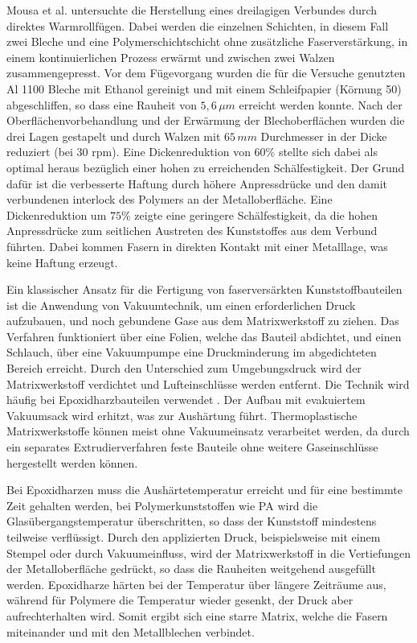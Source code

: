 Mousa et al. \cite{Mousa.2017} untersuchte die Herstellung eines dreilagigen Verbundes durch direktes Warmrollfügen. Dabei werden die einzelnen Schichten, in diesem Fall zwei Bleche und eine Polymerschichtschicht ohne zusätzliche Faserverstärkung, in einem kontinuierlichen Prozess erwärmt und zwischen zwei Walzen zusammengepresst. 
Vor dem Fügevorgang wurden die für die Versuche genutzten Al 1100 Bleche mit Ethanol gereinigt und mit einem Schleifpapier (Körnung 50) abgeschliffen, so dass eine Rauheit von $5,6\, \mu m$ erreicht werden konnte. Nach der Oberflächenvorbehandlung und der Erwärmung der Blechoberflächen wurden die drei Lagen gestapelt und durch Walzen mit $65\, mm$ Durchmesser in der Dicke reduziert (bei 30 rpm). Eine  Dickenreduktion von $60 \%$ stellte sich dabei als optimal heraus bezüglich einer hohen zu erreichenden Schälfestigkeit.
Der Grund dafür ist die verbesserte Haftung durch höhere Anpressdrücke und den damit verbundenen interlock des Polymers an der Metalloberfläche. Eine Dickenreduktion um $75\%$ zeigte eine geringere Schälfestigkeit, da die hohen Anpressdrücke zum seitlichen Austreten des Kunststoffes aus dem Verbund führten. Dabei kommen Fasern in direkten Kontakt mit einer Metalllage, was keine Haftung erzeugt. 

Ein klassischer Ansatz für die Fertigung von faserversärkten Kunststoffbauteilen ist die Anwendung von Vakuumtechnik, um einen erforderlichen Druck aufzubauen, und noch gebundene Gase aus dem Matrixwerkstoff zu ziehen. Das Verfahren funktioniert über eine Folien, welche das Bauteil abdichtet, und einen Schlauch, über eine Vakuumpumpe eine Druckminderung im abgedichteten Bereich erreicht. Durch den Unterschied zum Umgebungsdruck wird der Matrixwerkstoff verdichtet und Lufteinschlüsse werden entfernt. Die Technik wird häufig bei Epoxidharzbauteilen verwendet \cite{Bellini.2020}. Der Aufbau mit evakuiertem Vakuumsack wird erhitzt, was zur Aushärtung führt. Thermoplastische Matrixwerkstoffe können meist ohne Vakuumeinsatz verarbeitet werden, da durch ein separates Extrudierverfahren feste Bauteile ohne weitere Gaseinschlüsse hergestellt werden können.

Bei Epoxidharzen muss die Aushärtetemperatur erreicht und für eine bestimmte Zeit gehalten werden, bei Polymerkunststoffen wie PA wird die Glasübergangstemperatur überschritten, so dass der Kunststoff mindestens teilweise verflüssigt. Durch den applizierten Druck, beispielsweise mit einem Stempel oder durch Vakuumeinfluss, wird der Matrixwerkstoff in die Vertiefungen der Metalloberfläche gedrückt, so dass die Rauheiten weitgehend ausgefüllt werden.
Epoxidharze härten bei der Temperatur über längere Zeiträume aus, während für Polymere die Temperatur wieder gesenkt, der Druck aber aufrechterhalten wird. Somit ergibt sich eine starre Matrix, welche die Fasern miteinander und mit den Metallblechen verbindet. \cite{Sinmazcelik.2011}

